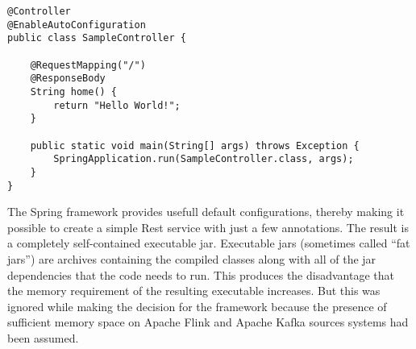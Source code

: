 \begin{lstlisting}[caption={Spring Boot "Hello World"}, captionpos=b, label={lst:spring-boot-hello-world}]
@Controller
@EnableAutoConfiguration
public class SampleController {

    @RequestMapping("/")
    @ResponseBody
    String home() {
        return "Hello World!";
    }

    public static void main(String[] args) throws Exception {
        SpringApplication.run(SampleController.class, args);
    }
}
\end{lstlisting}

The Spring framework provides usefull default configurations, thereby making it possible to create a simple Rest service
with just a few annotations. The result is a completely self-contained executable jar. Executable jars (sometimes called
“fat jars”) are archives containing the compiled classes along with all of the jar dependencies that the code needs to run.
This produces the disadvantage that the memory requirement of the resulting executable increases. But this was ignored while
making the decision for the framework because the presence of sufficient memory space on Apache Flink and Apache Kafka sources
systems had been assumed.

